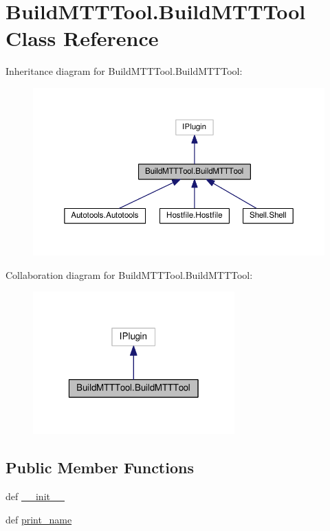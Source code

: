 \hypertarget{classBuildMTTTool_1_1BuildMTTTool}{\section{Build\-M\-T\-T\-Tool.\-Build\-M\-T\-T\-Tool Class Reference}
\label{classBuildMTTTool_1_1BuildMTTTool}
}


Inheritance diagram for Build\-M\-T\-T\-Tool.\-Build\-M\-T\-T\-Tool\-:
\nopagebreak
\begin{figure}[H]
\begin{center}
\leavevmode
\includegraphics[width=350pt]{classBuildMTTTool_1_1BuildMTTTool__inherit__graph}
\end{center}
\end{figure}


Collaboration diagram for Build\-M\-T\-T\-Tool.\-Build\-M\-T\-T\-Tool\-:
\nopagebreak
\begin{figure}[H]
\begin{center}
\leavevmode
\includegraphics[width=220pt]{classBuildMTTTool_1_1BuildMTTTool__coll__graph}
\end{center}
\end{figure}
\subsection*{Public Member Functions}
\begin{DoxyCompactItemize}
\item 
def \hyperlink{classBuildMTTTool_1_1BuildMTTTool_a5665b0ed7a6ef42181601533cdbe74be}{\-\_\-\-\_\-init\-\_\-\-\_\-}
\item 
def \hyperlink{classBuildMTTTool_1_1BuildMTTTool_afbb7e8957f4c8c43e2937489173de162}{print\-\_\-name}
\end{DoxyCompactItemize}


